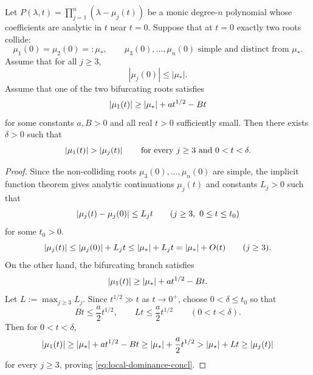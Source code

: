 \begin{lemma}\label{lem:local-dominance}
Let \(P(\lambda,t)=\prod_{j=1}^n(\lambda-\mu_j(t))\) be a monic degree-\(n\) polynomial whose coefficients are analytic in \(t\) near \(t=0\).
Suppose that at \(t=0\) exactly two roots collide:
\[
\mu_1(0)=\mu_2(0)=:\mu_*,
\qquad
\mu_3(0),\dots,\mu_n(0) \text{ simple and distinct from } \mu_*.
\]
Assume that for all \(j\ge 3\),
\begin{equation}\label{eq:local-dominance-hyp}
|\mu_j(0)|\le |\mu_*|.
\end{equation}
Assume that one of the two bifurcating roots satisfies
\begin{equation}\label{eq:bifurc-form}
\left\lvert \mu_1(t)\right\rvert \ge \left\lvert \mu_*\right\rvert + a t^{1/2} - B t
\end{equation}
for some constants \(a,B>0\) and all real \(t>0\) sufficiently small.
Then there exists \(\delta>0\) such that
\begin{equation}\label{eq:local-dominance-concl}
\left\lvert \mu_1(t)\right\rvert>\left\lvert \mu_j(t)\right\rvert
\qquad\text{for every } j\ge 3 \text{ and } 0<t<\delta.
\end{equation}

\begin{proof}
Since the non-colliding roots \(\mu_3(0),\dots,\mu_n(0)\) are simple, the implicit function theorem gives analytic continuations \(\mu_j(t)\) and constants \(L_j>0\) such that
\[
\left\lvert \mu_j(t)-\mu_j(0)\right\rvert\le L_j t
\qquad (j\ge 3,\ 0\le t\le t_0)
\]
for some \(t_0>0\).
\[
\left\lvert \mu_j(t)\right\rvert
\le
\left\lvert \mu_j(0)\right\rvert+L_j t
\le
\left\lvert \mu_*\right\rvert+L_j t
=
\left\lvert \mu_*\right\rvert+O(t)
\qquad (j\ge 3).
\]
On the other hand, the bifurcating branch satisfies
\[
\left\lvert \mu_1(t)\right\rvert\ge \left\lvert \mu_*\right\rvert+a t^{1/2}-Bt.
\]
Let \(L:=\max_{j\ge 3}L_j\).
Since \(t^{1/2}\gg t\) as \(t\to0^+\), choose \(0<\delta\le t_0\) so that
\[
Bt\le \frac{a}{2}t^{1/2},
\qquad
Lt\le \frac{a}{2}t^{1/2}
\qquad (0<t<\delta).
\]
Then for \(0<t<\delta\),
\[
\left\lvert \mu_1(t)\right\rvert
\ge
\left\lvert \mu_*\right\rvert+a t^{1/2}-Bt
\ge
\left\lvert \mu_*\right\rvert+\frac{a}{2}t^{1/2}
>
\left\lvert \mu_*\right\rvert+Lt
\ge
\left\lvert \mu_j(t)\right\rvert
\]
for every \(j\ge 3\), proving \eqref{eq:local-dominance-concl}.
\end{proof}
\end{lemma}

